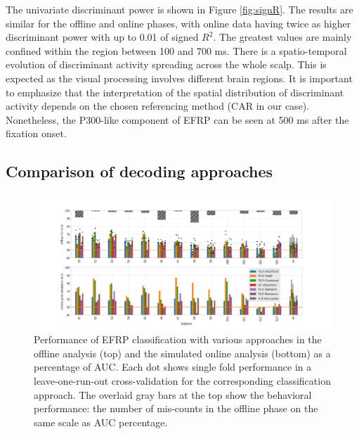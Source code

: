 \documentclass[12pt]{iopart}
\begin{document}
The univariate discriminant power is shown in Figure \ref{fig:signR}.
The results are similar for the offline and online phases, with online data having twice
as higher discriminant power with up to 0.01 of signed $R^2$.
The greatest values are mainly confined within the region between 100 and 700 ms.
There is a spatio-temporal evolution of discriminant activity spreading across the whole scalp. This is expected as the visual processing involves different brain regions. It is important to emphasize that the interpretation of the spatial distribution of discriminant activity depends on the chosen referencing method (CAR in our case). Nonetheless, the P300-like component of EFRP can be seen at 500 ms
after the fixation onset.



\subsection{Comparison of decoding approaches}
\label{sec:class}

\begin{figure}[!t]
    \includegraphics[trim={3cm 0cm 2cm 0cm},clip,width=1.1\columnwidth]{../images/ClassificationAll_FixDurSep.png}
    \caption{Performance of EFRP classification with various approaches in the offline analysis (top)
    and the simulated online analysis (bottom) as a percentage of AUC.
    Each dot shows single fold performance
    in a leave-one-run-out cross-validation for the corresponding classification approach.
    The overlaid gray bars at the top show the behavioral performance:
    the number of mis-counts in the offline phase on the same scale as AUC percentage.}
\label{fig:classAll}
\end{figure}
\end{document}
